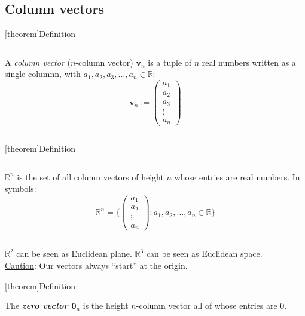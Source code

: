\documentclass[12pt]{report}
\theoremstyle{definition}
\begin{document}
\subsection{Column vectors}

[theorem]{Definition}
\begin{column vector}
    A \emph{column vector} ($n$-column vector) $\mathbf{v}_n$ is a tuple of $n$ real numbers written as a single columnn, 
    with $a_1, a_2, a_3, \ldots, a_n \in \mathbb{R}$:\[
    \mathbf{v}_n := 
    \begin{pmatrix}
        a_1 \\
        a_2 \\
        a_3 \\
        \vdots \\
        a_n
    \end{pmatrix}
    \]
\end{column vector}

[theorem]{Definition}
\begin{set of column vectors}
    $\mathbb{R}^{n}$ is the set of all column vectors of height $n$ whose entries are real numbers.
    In symbols:\[
        \mathbb{R}^{n} = \{
            \begin{pmatrix}
                    a_1\\
                    a_2\\
                    \vdots\\
                    a_n
            \end{pmatrix}
            : a_1, a_2, \ldots, a_n \in \mathbb{R}
        \} 
    \]
\end{set of column vectors}

\begin{ex}
    $\mathbb{R}^{2}$ can be seen as Euclidean plane. $\mathbb{R}^{3}$ can be seen as Euclidean space.
    \\\underline{Caution}: Our vectors always ``start'' at the origin.
\end{ex}

[theorem]{Definition}
\begin{zero vector}
    The \textbf{\emph{zero vector $\mathbf{0}_n$}} is the height $n$-column vector all of whose entries are 0.
\end{zero vector}
\end{document}
